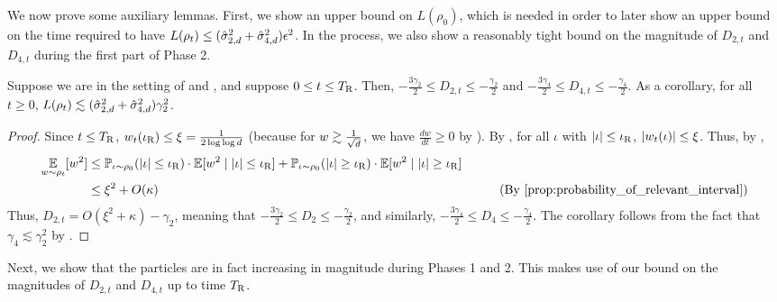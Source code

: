 We now prove some auxiliary lemmas. First, we show an upper bound on $L(\rho_0)$, which is needed in order to later show an upper bound on the time required to have $L(\rho_t) \leq (\hat{\sigma}_{2, d}^2 + \hat{\sigma}_{4, d}^2) \epsilon^2$. In the process, we also show a reasonably tight bound on the magnitude of $D_{2, t}$ and $D_{4, t}$ during the first part of Phase 2.

\begin{lemma} \label{lemma:phase1_d2_d4_neg}
Suppose we are in the setting of  and , and suppose $0 \leq t \leq {T_{\textup{R}}}$. Then, $-\frac{3\gamma_2}{2} \leq D_{2, t} \leq -\frac{\gamma_2}{2}$ and $-\frac{3\gamma_4}{2} \leq D_{4, t} \leq -\frac{\gamma_4}{2}$. As a corollary, for all $t \geq 0$, $L(\rho_t) \lesssim (\hat{\sigma}_{2, d}^2 + \hat{\sigma}_{4, d}^2) \gamma_2^2$.
\end{lemma}
\begin{proof}
Since $t \leq {T_{\textup{R}}}$, $w_t(\iota_{\textup{R}}) \leq \xi = \frac{1}{2 \log \log d}$ (because for $w \gtrsim \frac{1}{\sqrt{d}}$, we have $\frac{dw}{dt} \geq 0$ by ). By , for all $\iota$ with $|\iota| \leq \iota_{\textup{R}}$, $|w_t(\iota)| \leq \xi$. Thus, by ,
\begin{align}
\E_{\w \sim \rho_t}[\w^2]
& \leq \Prob_{\iota \sim \rho_0} (|\iota| \leq \iotaR) \cdot \E[\w^2 \mid |\iota| \leq \iotaR] + \Prob_{\iota \sim \rho_0} (|\iota| \geq \iotaR) \cdot \E[\w^2 \mid |\iota| \geq \iotaR] \\
& \leq \xi^2 + O(\kappa)
& \tag{By \Cref{prop:probability_of_relevant_interval}}
\end{align}
Thus, $D_{2, t} = O(\xi^2 + \kappa) - \gamma_2$, meaning that $-\frac{3\gamma_2}{2} \leq D_2 \leq -\frac{\gamma_2}{2}$, and similarly, $-\frac{3\gamma_4}{2} \leq D_4 \leq -\frac{\gamma_4}{2}$. The corollary follows from the fact that $\gamma_4 \lesssim \gamma_2^2$ by .
\end{proof}

Next, we show that the particles are in fact increasing in magnitude during Phases 1 and 2. This makes use of our bound on the magnitudes of $D_{2, t}$ and $D_{4, t}$ up to time ${T_{\textup{R}}}$.

